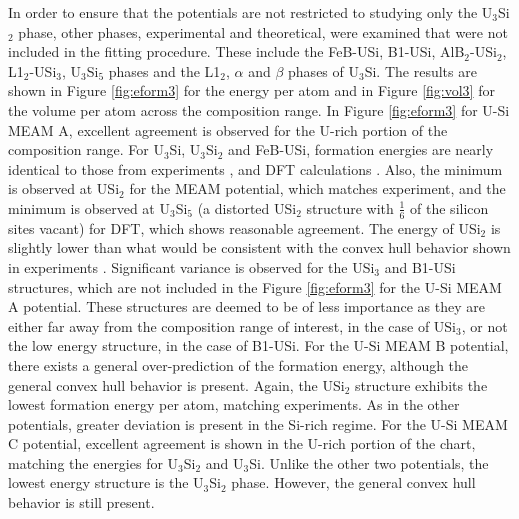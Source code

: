 \documentclass[review]{elsarticle}
\begin{document}
In order to ensure that the potentials are not restricted to studying only the U$_{3}$Si$_{2}$ phase, other phases, experimental and theoretical, were examined that were not included in the fitting procedure.  These include the FeB-USi, B1-USi, AlB$_{2}$-USi$_{2}$, L1$_{2}$-USi$_{3}$, U$_{3}$Si$_{5}$ phases and the L1$_{2}$, $\alpha$ and $\beta$ phases of U$_{3}$Si.  The results are shown in Figure \ref{fig:eform3}  for the energy per atom and in Figure \ref{fig:vol3} for the volume per atom across the composition range.  In Figure \ref{fig:eform3} for U-Si MEAM A, excellent agreement is observed for the U-rich portion of the composition range.  For U$_{3}$Si, U$_{3}$Si$_{2}$ and FeB-USi, formation energies are nearly identical to those from experiments \cite{berche2009}, and DFT calculations \cite{noordhoek2016}.  Also, the minimum is observed at USi$_{2}$ for the MEAM potential, which matches experiment, and the minimum is observed at U$_{3}$Si$_{5}$ (a distorted USi$_{2}$ structure with $\frac{1}{6}$ of the silicon sites vacant) for DFT, which shows reasonable agreement.  The energy of USi$_{2}$ is slightly lower than what would be consistent with the convex hull behavior shown in experiments \cite{berche2009}.  Significant variance is observed for the USi$_{3}$ and B1-USi structures, which are not included in the Figure \ref{fig:eform3} for the U-Si MEAM A potential.  These structures are deemed to be of less importance as they are either far away from the composition range of interest, in the case of USi$_{3}$, or not the low energy structure, in the case of B1-USi.  For the U-Si MEAM B potential, there exists a general over-prediction of the formation energy, although the general convex hull behavior is present.  Again, the USi$_{2}$ structure exhibits the lowest formation energy per atom, matching experiments.  As in the other potentials, greater deviation is present in the Si-rich regime.  For the U-Si MEAM C potential, excellent agreement is shown in the U-rich portion of the chart, matching the energies for U$_{3}$Si$_{2}$ and U$_{3}$Si.  Unlike the other two potentials, the lowest energy structure is the U$_{3}$Si$_{2}$ phase.  However, the general convex hull behavior is still present.  
\end{document}
